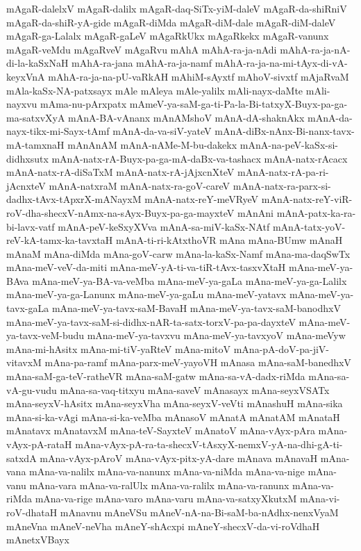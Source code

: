 {mAgaR-dalelxV
mAgaR-dalilx
mAgaR-daq-SiTx-yiM-daleV
mAgaR-da-shiRniV
mAgaR-da-shiR-yA-gide
mAgaR-diMda
mAgaR-diM-dale
mAgaR-diM-daleV
mAgaR-ga-Lalalx
mAgaR-gaLeV
mAgaRkUkx
mAgaRkekx
mAgaR-vanunx
mAgaR-veMdu
mAgaRveV
mAgaRvu
mAhA
mAhA-ra-ja-nAdi
mAhA-ra-ja-nA-di-la-kaSxNaH
mAhA-ra-jana
mAhA-ra-ja-namf
mAhA-ra-ja-na-mi-tAyx-di-vA-keyxVnA
mAhA-ra-ja-na-pU-vaRkAH
mAhiM-sAyxtf
mAhoV-sivxtf
mAjaRvaM
mAla-kaSx-NA-patxsayx
mAle
mAleya
mAle-yalilx
mAli-nayx-daMte
mAli-nayxvu
mAma-nu-pArxpatx
mAmeV-ya-saM-ga-ti-Pa-la-Bi-tatxyX-Buyx-pa-ga-ma-satxvXyA
mAnA-BA-vAnanx
mAnAMshoV
mAnA-dA-shaknAkx
mAnA-da-nayx-tikx-mi-Sayx-tAmf
mAnA-da-va-siV-yateV
mAnA-diBx-nAnx-Bi-nanx-tavx-mA-tamxnaH
mAnAnAM
mAnA-nAMe-M-bu-dakekx
mAnA-na-peV-kaSx-si-didhxsutx
mAnA-natx-rA-Buyx-pa-ga-mA-daBx-va-tashacx
mAnA-natx-rAcacx
mAnA-natx-rA-diSaTxM
mAnA-natx-rA-jAjxcnXteV
mAnA-natx-rA-pa-ri-jAcnxteV
mAnA-natxraM
mAnA-natx-ra-goV-careV
mAnA-natx-ra-parx-si-dadhx-tAvx-tApxrX-mANayxM
mAnA-natx-reY-meVRyeV
mAnA-natx-reY-viR-roV-dha-shecxV-nAmx-na-sAyx-Buyx-pa-ga-mayxteV
mAnAni
mAnA-patx-ka-ra-bi-lavx-vatf
mAnA-peV-keSxyXVva
mAnA-sa-miV-kaSx-NAtf
mAnA-tatx-yoV-reV-kA-tamx-ka-tavxtaH
mAnA-ti-ri-kAtxthoVR
mAna
mAna-BUmw
mAnaH
mAnaM
mAna-diMda
mAna-goV-carw
mAna-la-kaSx-Namf
mAna-ma-daqSwTx
mAna-meV-veV-da-miti
mAna-meV-yA-ti-va-tiR-tAvx-tasxvXtaH
mAna-meV-ya-BAva
mAna-meV-ya-BA-va-veMba
mAna-meV-ya-gaLa
mAna-meV-ya-ga-Lalilx
mAna-meV-ya-ga-Lanunx
mAna-meV-ya-gaLu
mAna-meV-yatavx
mAna-meV-ya-tavx-gaLa
mAna-meV-ya-tavx-saM-BavaH
mAna-meV-ya-tavx-saM-banodhxV
mAna-meV-ya-tavx-saM-si-didhx-nAR-ta-satx-torxV-pa-pa-dayxteV
mAna-meV-ya-tavx-veM-budu
mAna-meV-ya-tavxvu
mAna-meV-ya-tavxyoV
mAna-meVyw
mAna-mi-hAsitx
mAna-mi-tiV-yaRteV
mAna-mitoV
mAna-pA-doV-pa-jiV-vitavxM
mAna-pa-ramf
mAna-parx-meV-yayoVH
mAnasa
mAna-saM-banedhxV
mAna-saM-ga-teV-ratheVR
mAna-saM-gatw
mAna-sa-vA-dadx-riMda
mAna-sa-vA-gu-vudu
mAna-sa-vaq-titxyu
mAna-saveV
mAnasayx
mAna-seyxVSATx
mAna-seyxV-hAsitx
mAna-seyxVha
mAna-seyxV-veVti
mAnashuH
mAna-sika
mAna-si-ka-vAgi
mAna-si-ka-veMba
mAnasoV
mAnatA
mAnatAM
mAnataH
mAnatavx
mAnatavxM
mAna-teV-SayxteV
mAnatoV
mAna-vAyx-pAra
mAna-vAyx-pA-rataH
mAna-vAyx-pA-ra-ta-shecxV-tAsxyX-nemxV-yA-na-dhi-gA-ti-satxdA
mAna-vAyx-pAroV
mAna-vAyx-pitx-yA-dare
mAnava
mAnavaH
mAna-vana
mAna-va-nalilx
mAna-va-nanunx
mAna-va-niMda
mAna-va-nige
mAna-vanu
mAna-vara
mAna-va-ralUlx
mAna-va-ralilx
mAna-va-ranunx
mAna-va-riMda
mAna-va-rige
mAna-varo
mAna-varu
mAna-va-satxyXkutxM
mAna-vi-roV-dhataH
mAnavnu
mAneVSu
mAneV-nA-na-Bi-saM-ba-nAdhx-nenxVyaM
mAneVna
mAneV-neVha
mAneY-shAcxpi
mAneY-shecxV-da-vi-roVdhaH
mAnetxVBayx
}
